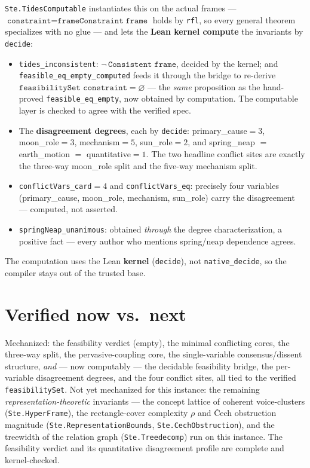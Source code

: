 \documentclass[11pt]{article}
\newcommand{\lean}[1]{\texttt{#1}}
\newcommand{\vv}[1]{\textsf{\small #1}}
\begin{document}
\lean{Ste.TidesComputable} instantiates this on the actual frames ---
$\lean{constraint} = \lean{frameConstraint}\;\lean{frame}$ holds by
\lean{rfl}, so every general theorem specializes with no glue --- and lets
the \textbf{Lean kernel compute} the invariants by \lean{decide}:

\begin{itemize}
\item \lean{tides\_inconsistent}: $\neg\,\lean{Consistent}\;\lean{frame}$,
  decided by the kernel; and \lean{feasible\_eq\_empty\_computed} feeds it
  through the bridge to re-derive $\lean{feasibilitySet constraint} =
  \varnothing$ --- the \emph{same} proposition as the hand-proved
  \lean{feasible\_eq\_empty}, now obtained by computation. The computable
  layer is checked to agree with the verified spec.
\item The \textbf{disagreement degrees}, each by \lean{decide}:
  \vv{primary\_cause}$=3$, \vv{moon\_role}$=3$, \vv{mechanism}$=5$,
  \vv{sun\_role}$=2$, and \vv{spring\_neap} $=$ \vv{earth\_motion} $=$
  \vv{quantitative}$=1$. The two headline conflict sites are exactly the
  three-way \vv{moon\_role} split and the five-way \vv{mechanism} split.
\item \lean{conflictVars\_card}$=4$ and \lean{conflictVars\_eq}: precisely
  four variables (\vv{primary\_cause}, \vv{moon\_role}, \vv{mechanism},
  \vv{sun\_role}) carry the disagreement --- computed, not asserted.
\item \lean{springNeap\_unanimous}: obtained \emph{through} the degree
  characterization, a positive fact --- every author who mentions
  spring/neap dependence agrees.
\end{itemize}

The computation uses the Lean \textbf{kernel} (\lean{decide}), not
\lean{native\_decide}, so the compiler stays out of the trusted base.

\section{Verified now vs.\ next}

Mechanized: the feasibility verdict (empty), the minimal conflicting
cores, the three-way split, the pervasive-coupling core, the
single-variable consensus/dissent structure, \emph{and} --- now computably
--- the decidable feasibility bridge, the per-variable disagreement
degrees, and the four conflict sites, all tied to the verified
\lean{feasibilitySet}. Not yet mechanized for this instance: the remaining
\emph{representation-theoretic} invariants --- the concept lattice of
coherent voice-clusters (\lean{Ste.HyperFrame}), the rectangle-cover
complexity $\rho$ and \v{C}ech obstruction magnitude
(\lean{Ste.RepresentationBounds}, \lean{Ste.CechObstruction}), and the
treewidth of the relation graph (\lean{Ste.Treedecomp}) run on this
instance. The feasibility verdict and its quantitative disagreement
profile are complete and kernel-checked.



\end{document}
